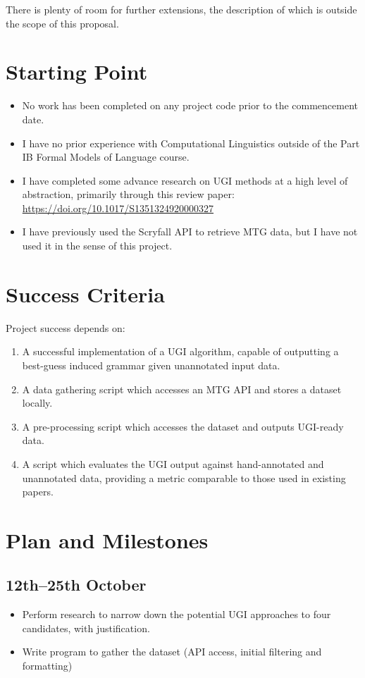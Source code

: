 \documentclass{article}
\begin{document}
There is plenty of room for further extensions, the description of which is outside the scope of this proposal.

\section{Starting Point}

\begin{itemize}
        \item No work has been completed on any project code prior to the commencement date.
        \item I have no prior experience with Computational Linguistics outside of the Part IB Formal Models of Language course.
        \item I have completed some advance research on UGI methods at a high level of abstraction, primarily through this review paper: \url{https://doi.org/10.1017/S1351324920000327}
        \item I have previously used the Scryfall API to retrieve MTG data, but I have not used it in the sense of this project.
    \end{itemize}

\section{Success Criteria}

Project success depends on:
\begin{enumerate}
    \item A successful implementation of a UGI algorithm, capable of outputting a best-guess induced grammar given unannotated input data.
    \item A data gathering script which accesses an MTG API and stores a dataset locally. 
    \item A pre-processing script which accesses the dataset and outputs UGI-ready data.
    \item A script which evaluates the UGI output against hand-annotated and unannotated data, providing a metric comparable to those used in existing papers.
\end{enumerate}

\section{Plan and Milestones}

\subsection{12th--25th October}
\begin{itemize}
    \item Perform research to narrow down the potential UGI approaches to four candidates, with justification.
    \item Write program to gather the dataset (API access, initial filtering and formatting)
\end{itemize}
\end{document}
